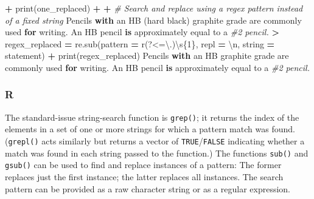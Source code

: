 \documentclass[
]{book}
\newenvironment{Shaded}{\begin{snugshade}}{\end{snugshade}}
\newcommand{\BuiltInTok}[1]{#1}
\newcommand{\CharTok}[1]{\textcolor[rgb]{0.31,0.60,0.02}{#1}}
\newcommand{\CommentTok}[1]{\textcolor[rgb]{0.56,0.35,0.01}{\textit{#1}}}
\newcommand{\ControlFlowTok}[1]{\textcolor[rgb]{0.13,0.29,0.53}{\textbf{#1}}}
\newcommand{\KeywordTok}[1]{\textcolor[rgb]{0.13,0.29,0.53}{\textbf{#1}}}
\newcommand{\NormalTok}[1]{#1}
\newcommand{\OperatorTok}[1]{\textcolor[rgb]{0.81,0.36,0.00}{\textbf{#1}}}
\newcommand{\SpecialCharTok}[1]{\textcolor[rgb]{0.00,0.00,0.00}{#1}}
\newcommand{\StringTok}[1]{\textcolor[rgb]{0.31,0.60,0.02}{#1}}
\newcommand{\VerbatimStringTok}[1]{\textcolor[rgb]{0.31,0.60,0.02}{#1}}
\begin{document}
\begin{Shaded}
\begin{Highlighting}[]
\OperatorTok{+} \BuiltInTok{print}\NormalTok{(one\_replaced)}
\OperatorTok{+} 
\OperatorTok{+} \CommentTok{\# Search and replace using a regex pattern instead of a fixed string}
\NormalTok{Pencils }\ControlFlowTok{with}\NormalTok{ an HB (hard black) graphite grade are commonly used }\ControlFlowTok{for}\NormalTok{ writing. An HB pencil }\KeywordTok{is}\NormalTok{ approximately equal to a }\CommentTok{\#2 pencil.}
\OperatorTok{\textgreater{}}\NormalTok{ regex\_replaced }\OperatorTok{=}\NormalTok{ re.sub(pattern }\OperatorTok{=} \VerbatimStringTok{r\textquotesingle{}(?\textless{}=\textbackslash{}.)\textbackslash{}s}\SpecialCharTok{\{1\}}\VerbatimStringTok{\textquotesingle{}}\NormalTok{, repl }\OperatorTok{=} \StringTok{\textquotesingle{}}\CharTok{\textbackslash{}n}\StringTok{\textquotesingle{}}\NormalTok{, string }\OperatorTok{=}\NormalTok{ statement)}
\OperatorTok{+} \BuiltInTok{print}\NormalTok{(regex\_replaced)}
\NormalTok{Pencils }\ControlFlowTok{with}\NormalTok{ an HB graphite grade are commonly used }\ControlFlowTok{for}\NormalTok{ writing.}
\NormalTok{An HB pencil }\KeywordTok{is}\NormalTok{ approximately equal to a }\CommentTok{\#2 pencil.}
\end{Highlighting}
\end{Shaded}

\hypertarget{r-25}{%
\subsubsection*{R}\label{r-25}}

The standard-issue string-search function is \texttt{grep()}; it returns the index of the elements in a set of one or more strings for which a pattern match was found. (\texttt{grepl()} acts similarly but returns a vector of \texttt{TRUE}/\texttt{FALSE} indicating whether a match was found in each string passed to the function.) The functions \texttt{sub()} and \texttt{gsub()} can be used to find and replace instances of a pattern: The former replaces just the first instance; the latter replaces all instances. The search pattern can be provided as a raw character string or as a regular expression.
\end{document}
